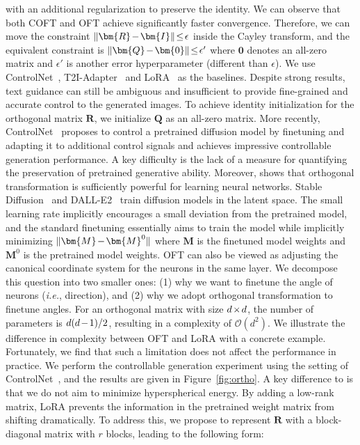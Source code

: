 \begin{itemize}[leftmargin=*,nosep]
\begin{itemize}[leftmargin=*,nosep]
with an additional regularization to preserve the identity. We can observe that both COFT and OFT achieve significantly faster convergence. Therefore, we can move the constraint $\thickmuskip=2mu \medmuskip=2mu\|\bm{R}-\bm{I}\|\leq\epsilon$ inside the Cayley transform, and the equivalent constraint is $\thickmuskip=2mu \medmuskip=2mu \|\bm{Q}-\bm{0}\|\leq\epsilon'$ where $\bm{0}$ denotes an all-zero matrix and $\epsilon'$ is another error hyperparameter (different than $\epsilon$). We use ControlNet~\cite{zhang2023adding}, T2I-Adapter~\cite{mou2023t2i} and LoRA~\cite{hulora2022} as the baselines. Despite strong results, text guidance can still be ambiguous and insufficient to provide fine-grained and accurate control to the generated images. To achieve identity initialization for the orthogonal matrix $\bm{R}$, we initialize $\bm{Q}$ as an all-zero matrix. More recently, ControlNet~\cite{zhang2023adding} proposes to control a pretrained diffusion model by finetuning and adapting it to additional control signals and achieves impressive controllable generation performance. A key difficulty is the lack of a measure for quantifying the preservation of pretrained generative ability. Moreover, \cite{liu2021orthogonal} shows that orthogonal transformation is sufficiently powerful for learning neural networks. Stable Diffusion~\cite{rombach2022high} and DALL-E2~\cite{ramesh2022hierarchical} train diffusion models in the latent space. The small learning rate implicitly encourages a small deviation from the pretrained model, and the standard finetuning essentially aims to train the model while implicitly minimizing $\thickmuskip=2mu \medmuskip=2mu \| \bm{M} - \bm{M}^0\|$ where $\bm{M}$ is the finetuned model weights and $\bm{M}^0$ is the pretrained model weights. OFT can also be viewed as adjusting the canonical coordinate system for the neurons in the same layer. We decompose this question into two smaller ones: (1) why we want to finetune the angle of neurons (\emph{i.e.}, direction), and (2) why we adopt orthogonal transformation to finetune angles. For an orthogonal matrix with size $\thickmuskip=2mu \medmuskip=2mu d\times d$, the number of parameters is $\thickmuskip=2mu \medmuskip=2mu d(d-1)/2$, resulting in a complexity of $\mathcal{O}(d^2)$. We illustrate the difference in complexity between OFT and LoRA with a concrete example. Fortunately, we find that such a limitation does not affect the performance in practice. We perform the controllable generation experiment using the setting of ControlNet~\cite{zhang2023adding}, and the results are given in Figure~\ref{fig:ortho}. A key difference to \cite{liu2021orthogonal} is that we do not aim to minimize hyperspherical energy. By adding a low-rank matrix, LoRA prevents the information in the pretrained weight matrix from shifting dramatically. To address this, we propose to represent $\bm{R}$ with a block-diagonal matrix with $r$ blocks, leading to the following form:


\end{itemize}
\end{itemize}
